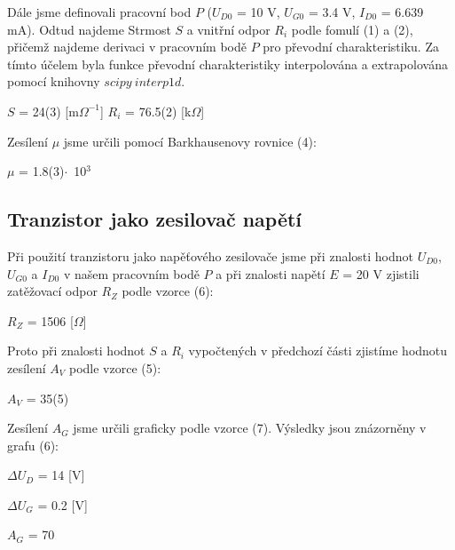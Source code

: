 \documentclass[a4paper,11pt]{article}
\begin{document}
    \begin{minipage}[t]{0.5\textwidth}
                Dále jsme definovali pracovní bod $P$ ($U_{D0}$ = 10 V, $U_{G0}$ = 3.4 V, $I_{D0}$ = 6.639 mA). Odtud najdeme Strmost $S$ a vnitřní odpor $R_i$ podle fomulí (1) a (2), přičemž najdeme derivaci v pracovním bodě $P$ pro převodní charakteristiku. Za tímto účelem byla funkce převodní charakteristiky interpolována a extrapolována pomocí knihovny $scipy~interp1d$.
                \begin{center}
                    $S$ = 24(3) [m$\Omega^{-1}$] \hspace{10pt} $R_i$ = 76.5(2) [k$\Omega$]
                \end{center}
                \par Zesílení $\mu$ jsme určili pomocí Barkhausenovy rovnice (4):
                \begin{center}
                    $\mu$ = 1.8(3)$\cdot$~10$^3$
                \end{center}
            \subsection{Tranzistor jako zesilovač napětí}
            Při použití tranzistoru jako napěťového zesilovače jsme při znalosti hodnot $U_{D0}$, $U_{G0}$ a $I_{D0}$ v našem pracovním bodě $P$ a při znalosti napětí $E$ = 20 V zjistili zatěžovací odpor $R_Z$ podle vzorce (6):
            \begin{center}
                $R_Z$ = 1506 [$\Omega$]
            \end{center}
            Proto při znalosti hodnot $S$ a $R_i$ vypočtených v předchozí části zjistíme hodnotu zesílení $A_V$ podle vzorce (5):
            \begin{center}
                $A_V$ = 35(5)
            \end{center}
            \par Zesílení $A_G$ jsme určili graficky podle vzorce (7). Výsledky jsou znázorněny v grafu (6):
            \begin{center}
                $\Delta U_D$ = 14 [V]
                \vspace{5pt}
                \par $\Delta U_G$ = 0.2 [V]
                \vspace{5pt}
                \par $A_G$ = 70
            \end{center}
    \end{minipage}
\end{document}
